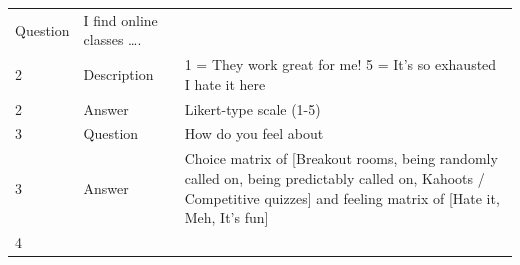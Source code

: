 \documentclass[paper=a4,justified,a4paper]{tufte-handout}
\begin{document}
\begin{longtable}[]{@{}lll@{}}
\begin{minipage}[t]{0.30\columnwidth}
Question\strut
\end{minipage} & \begin{minipage}[t]{0.30\columnwidth}\raggedright
I find online classes \ldots{}.\strut
\end{minipage}\tabularnewline
\begin{minipage}[t]{0.30\columnwidth}\raggedright
2\strut
\end{minipage} & \begin{minipage}[t]{0.30\columnwidth}\raggedright
Description\strut
\end{minipage} & \begin{minipage}[t]{0.30\columnwidth}\raggedright
1 = They work great for me! 5 = It's so exhausted I hate it here\strut
\end{minipage}\tabularnewline
\begin{minipage}[t]{0.30\columnwidth}\raggedright
2\strut
\end{minipage} & \begin{minipage}[t]{0.30\columnwidth}\raggedright
Answer\strut
\end{minipage} & \begin{minipage}[t]{0.30\columnwidth}\raggedright
Likert-type scale (1-5)\strut
\end{minipage}\tabularnewline
\begin{minipage}[t]{0.30\columnwidth}\raggedright
3\strut
\end{minipage} & \begin{minipage}[t]{0.30\columnwidth}\raggedright
Question\strut
\end{minipage} & \begin{minipage}[t]{0.30\columnwidth}\raggedright
How do you feel about\strut
\end{minipage}\tabularnewline
\begin{minipage}[t]{0.30\columnwidth}\raggedright
3\strut
\end{minipage} & \begin{minipage}[t]{0.30\columnwidth}\raggedright
Answer\strut
\end{minipage} & \begin{minipage}[t]{0.30\columnwidth}\raggedright
Choice matrix of {[}Breakout rooms, being randomly called on, being
predictably called on, Kahoots / Competitive quizzes{]} and feeling
matrix of {[}Hate it, Meh, It's fun{]}\strut
\end{minipage}\tabularnewline
\begin{minipage}[t]{0.30\columnwidth}\raggedright
4\strut
\end{minipage} & \begin{minipage}[t]{0.30\columnwidth}\raggedright

\end{minipage}
\end{longtable}
\end{document}
